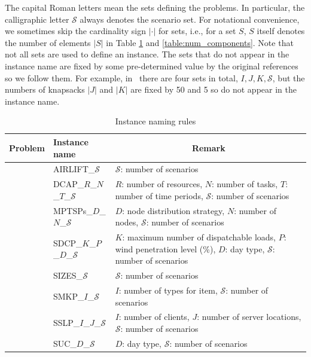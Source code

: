 The capital Roman letters mean the sets defining the problems. In particular, the calligraphic letter $\mathcal{S}$ always denotes the scenario set. For notational convenience, we sometimes skip the cardinality sign $|\cdot|$ for sets, i.e., for a set $S$, $S$ itself denotes the number of elements $|S|$ in Table \ref{table:naming_rule} and \ref{table:num_components}. Note that not all sets are used to define an instance. The sets that do not appear in the instance name are fixed by some pre-determined value by the original references so we follow them. For example, in \smkp\ there are four sets in total, $I,J,K,\mathcal{S}$, but the numbers of knapsacks $|J|$ and $|K|$ are fixed by 50 and 5 so do not appear in the instance name.
\begin{table}[H]
	\centering
	\caption{Instance naming rules}
	\label{table:naming_rule}
	\resizebox{\textwidth}{!}
	{%
		\begin{tabular}{@{}llp{3in}}
			\toprule
			Problem & Instance name                 & \multicolumn{1}{c}{Remark}                                                                    					      \\ \midrule
			\airlift	& AIRLIFT\_$\mathcal{S}$& $\mathcal{S}$: number of scenarios\\
			\dcap\    & DCAP\_$R$\_$N$\_$T$\_$\mathcal{S}$    &   $R$: number of resources, $N$: number of tasks, $T$: number of time periods, $\mathcal{S}$: number of scenarios        \\
			\mptsps\  & MPTSPs\_$D$\_$N$\_$\mathcal{S}$ &$D$: node distribution strategy, $N$: number of nodes, $\mathcal{S}$: number of scenarios\\
			\sdcp\ & SDCP\_$K$\_$P$\_$D$\_$\mathcal{S}$ & $K$: maximum number of dispatchable loads, $P$: wind penetration level (\%), $D$: day type, $\mathcal{S}$: number of scenarios\\
			\sizes\   & SIZES\_$\mathcal{S}$                            & $\mathcal{S}$: number of scenarios   															\\
			\smkp\    &   SMKP\_$I$\_$\mathcal{S}$    &   $I$: number of types for item, $\mathcal{S}$: number of scenarios  													 \\
			\sslp\    &  SSLP\_$I$\_$J$\_$\mathcal{S}$      &    $I$: number of clients, $J$: number of server locations, $\mathcal{S}$: number of scenarios                 				   \\
			\suc\    & 	SUC\_$D$\_$\mathcal{S}$    &  $D$: day type, $\mathcal{S}$: number of scenarios                                                 						 \\ \bottomrule
		\end{tabular}%
	}
\end{table}

